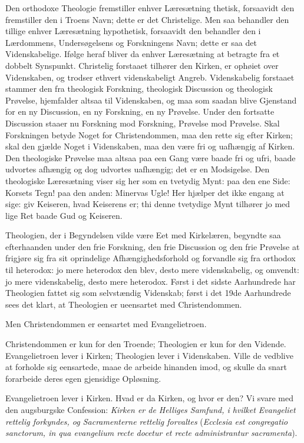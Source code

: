 \documentclass[12pt,a4paper]{book}
\newcommand{\opage}[1]{\marginnote{\footnotesize\textit{[#1]}}}
\begin{document}
Den orthodoxe Theologie fremstiller enhver Læresætning thetisk,
forsaavidt den fremstiller den i Troens Navn; dette er det Christelige.
Men saa behandler den tillige enhver Læresætning hypothetisk, forsaavidt
den behandler den i Lærdommens, Undersøgelsens og Forskningens Navn;
dette er saa det Videnskabelige. Ifølge heraf bliver da enhver
Læresætning at betragte fra et dobbelt Synspunkt. Christelig forstaaet
tilhører den Kirken, er ophøiet over Videnskaben, og trodser ethvert
videnskabeligt Angreb. Videnskabelig forstaaet stammer den fra theologisk
Forskning, theologisk Discussion og theologisk Prøvelse, hjemfalder
altsaa til Videnskaben, og maa som saadan blive Gjenstand for en ny
Discussion, en ny Forskning, en ny Prøvelse. Under den fortsatte
Discussion staaer nu Forskning mod Forskning, Prøvelse mod Prøvelse.
Skal Forskningen betyde Noget for Christendommen, maa den rette sig
efter Kirken; skal den gjælde Noget i Videnskaben, maa den være fri og
uafhængig af Kirken. Den theologiske Prøvelse maa altsaa paa een Gang
være baade fri og ufri, baade udvortes afhængig og dog udvortes
uafhængig; det er en Modsigelse. Den theologiske Læresætning viser sig
her som en tvetydig Mynt: paa den ene Side: Korsets Tegn! paa den anden:
Minervas Ugle! Her hjælper det ikke engang at sige: giv Keiseren, hvad
Keiserens er; thi denne tvetydige Mynt tilhører jo med lige Ret baade Gud
og Keiseren.

Theologien, der i Begyndelsen vilde være Eet med Kirkelæren, begyndte saa
efterhaanden under den frie Forskning, den frie Discussion og den frie
Prøvelse at frigjøre sig fra sit oprindelige Afhængighedsforhold og
forvandle sig fra orthodox til heterodox: jo mere heterodox den blev,
desto mere videnskabelig, og omvendt: jo mere videnskabelig, desto mere
heterodox. Først
i det sidste Aarhundrede har Theologien fattet sig som selvstændig
\opage{11}Videnskab; først i det 19de Aarhundrede sees det klart, at Theologien er
ueensartet med Christendommen.

Men Christendommen er eensartet med Evangelietroen.

Christendommen er kun for den Troende; Theologien er kun for den
Vidende. Evangelietroen lever i Kirken; Theologien lever i Videnskaben.
Ville de vedblive at forholde sig eensartede, maae de arbeide hinanden
imod, og skulle da snart forarbeide deres egen gjensidige Opløsning.

Evangelietroen lever i Kirken. Hvad er da Kirken, og hvor er den? Vi
svare med den augsburgske Confession: \emph{Kirken er de Helliges
Samfund, i hvilket Evangeliet rettelig forkyndes, og Sacramenterne
rettelig forvaltes} (\textit{Ecclesia est congregatio sanctorum, in qua
evangelium recte docetur et recte administrantur sacramenta}).
\end{document}

